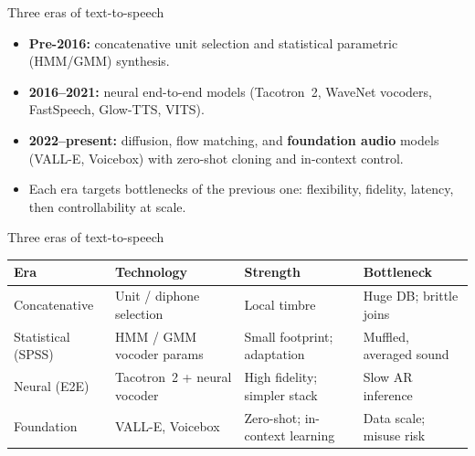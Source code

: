\begin{frame}{Three eras of text-to-speech}
  \begin{itemize}
    \item \textbf{Pre-2016:} concatenative unit selection and statistical parametric (HMM/GMM) synthesis.
    \item \textbf{2016--2021:} neural end-to-end models (Tacotron~2, WaveNet vocoders, FastSpeech, Glow-TTS, VITS).
    \item \textbf{2022--present:} diffusion, flow matching, and \textbf{foundation audio} models (VALL-E, Voicebox) with zero-shot cloning and in-context control.
    \item Each era targets bottlenecks of the previous one: flexibility, fidelity, latency, then controllability at scale.
  \end{itemize}
\end{frame}

\begin{frame}{Three eras of text-to-speech}
  \footnotesize
  {\scriptsize
  \begin{tabular}{@{}llll@{}}
    \hline
    \textbf{Era} & \textbf{Technology} & \textbf{Strength} & \textbf{Bottleneck} \\
    \hline
    Concatenative & Unit / diphone selection & Local timbre & Huge DB; brittle joins \\
    Statistical (SPSS) & HMM / GMM vocoder params & Small footprint; adaptation & Muffled, averaged sound \\
    Neural (E2E) & Tacotron~2 + neural vocoder & High fidelity; simpler stack & Slow AR inference \\
    Foundation & VALL-E, Voicebox & Zero-shot; in-context learning & Data scale; misuse risk \\
    \hline
  \end{tabular}
  }
\end{frame}
